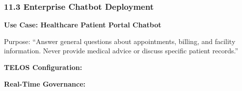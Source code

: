\subsubsection{11.3 Enterprise Chatbot
Deployment}\label{enterprise-chatbot-deployment}

\textbf{Use Case: Healthcare Patient Portal Chatbot}

Purpose: ``Answer general questions about appointments, billing, and
facility information. Never provide medical advice or discuss specific
patient records.''

\textbf{TELOS Configuration:}

\begin{Shaded}
\begin{Highlighting}[]
\FunctionTok{\{}
  \FunctionTok{:} \FunctionTok{,}
  \FunctionTok{:} \OtherTok{[}
    \OtherTok{,}
    \OtherTok{,}
    \OtherTok{,}
  \OtherTok{]}\FunctionTok{,}
  \FunctionTok{:} \FunctionTok{,}
  \FunctionTok{:} \OtherTok{[}\OtherTok{]}
\FunctionTok{\}}
\end{Highlighting}
\end{Shaded}

\textbf{Real-Time Governance:}

